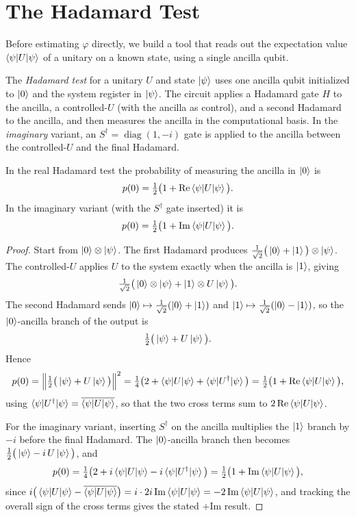 \section{The Hadamard Test}

Before estimating $\varphi$ directly, we build a tool that reads out the
expectation value $\braket{\psi|U|\psi}$ of a unitary on a known state, using a
single ancilla qubit.

\begin{definition}
The \emph{Hadamard test} for a unitary $U$ and state $\ket{\psi}$ uses one
ancilla qubit initialized to $\ket{0}$ and the system register in $\ket{\psi}$.
The circuit applies a Hadamard gate $H$ to the ancilla, a controlled-$U$
(with the ancilla as control), and a second Hadamard to the ancilla, and then
measures the ancilla in the computational basis. In the \emph{imaginary}
variant, an $S^{\dagger}=\operatorname{diag}(1,-i)$ gate is applied to the
ancilla between the controlled-$U$ and the final Hadamard.
\end{definition}

\begin{theorem}
\label{l6:thm:hadamard}
In the real Hadamard test the probability of measuring the ancilla in $\ket{0}$
is
\[
  p(0)=\tfrac12\big(1+\mathrm{Re}\braket{\psi|U|\psi}\big).
\]
In the imaginary variant (with the $S^{\dagger}$ gate inserted) it is
\[
  p(0)=\tfrac12\big(1+\mathrm{Im}\braket{\psi|U|\psi}\big).
\]
\end{theorem}

\begin{proof}
Start from $\ket{0}\otimes\ket{\psi}$. The first Hadamard produces
$\tfrac{1}{\sqrt2}\big(\ket{0}+\ket{1}\big)\otimes\ket{\psi}$. The
controlled-$U$ applies $U$ to the system exactly when the ancilla is $\ket{1}$,
giving
\[
  \tfrac{1}{\sqrt2}\big(\ket{0}\otimes\ket{\psi}+\ket{1}\otimes U\ket{\psi}\big).
\]
The second Hadamard sends $\ket{0}\mapsto\tfrac{1}{\sqrt2}(\ket{0}+\ket{1})$ and
$\ket{1}\mapsto\tfrac{1}{\sqrt2}(\ket{0}-\ket{1})$, so the $\ket{0}$-ancilla
branch of the output is
\[
  \tfrac12\big(\ket{\psi}+U\ket{\psi}\big).
\]
Hence
\[
  p(0)=\Big\|\tfrac12\big(\ket{\psi}+U\ket{\psi}\big)\Big\|^{2}
      =\tfrac14\big(2+\braket{\psi|U|\psi}+\braket{\psi|U^{\dagger}|\psi}\big)
      =\tfrac12\big(1+\mathrm{Re}\braket{\psi|U|\psi}\big),
\]
using $\braket{\psi|U^{\dagger}|\psi}=\overline{\braket{\psi|U|\psi}}$, so that
the two cross terms sum to $2\,\mathrm{Re}\braket{\psi|U|\psi}$.

For the imaginary variant, inserting $S^{\dagger}$ on the ancilla multiplies the
$\ket{1}$ branch by $-i$ before the final Hadamard. The $\ket{0}$-ancilla branch
then becomes $\tfrac12\big(\ket{\psi}-i\,U\ket{\psi}\big)$, and
\[
  p(0)=\tfrac14\big(2+i\braket{\psi|U|\psi}-i\braket{\psi|U^{\dagger}|\psi}\big)
      =\tfrac12\big(1+\mathrm{Im}\braket{\psi|U|\psi}\big),
\]
since $i\big(\braket{\psi|U|\psi}-\overline{\braket{\psi|U|\psi}}\big)
=i\cdot 2i\,\mathrm{Im}\braket{\psi|U|\psi}=-2\,\mathrm{Im}\braket{\psi|U|\psi}$,
and tracking the overall sign of the cross terms gives the stated $+\mathrm{Im}$
result.
\end{proof}

